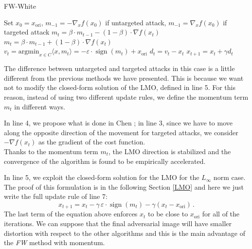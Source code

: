 \documentclass[10pt,twocolumn,letterpaper, english]{article}
\newcommand{\sign}{\mathop{\mathrm{sign}}}
\theoremstyle{definition}
\theoremstyle{plain}
\theoremstyle{plain}
\theoremstyle{plain}
\theoremstyle{plain}
\theoremstyle{remark}
\theoremstyle{remark}
\theoremstyle{definition}
\theoremstyle{definition}
\theoremstyle{definition}
\theoremstyle{definition}
\renewcommand{\epsilon}{\varepsilon}
\begin{document}
\begin{algorithm}
\caption{FW-White}\label{FW}
\begin{algorithmic}[1]

\State Set $x_0 = x_{\text{ori}}$, $m_{-1} = - \nabla_x f(x_0)$ if untargeted attack, $m_{-1} = \nabla_x f(x_0)$ if targeted attack
    \State $m_t = \beta \cdot m_{t-1} - (1-\beta) \cdot \nabla f(x_t) $ 
    \State $m_t = \beta \cdot m_{t-1} + (1-\beta) \cdot \nabla f(x_t) $ 
    \State $v_t = \text{argmin}_{x \in C} \langle x, m_t \rangle = - \epsilon \cdot \sign (m_t) + x_{\text{ori}} $
    \State $d_t = v_t - x_t $
    \State $x_{t+1} = x_t + \gamma d_t $
    
\EndFor
\end{algorithmic}
\end{algorithm}

The difference between untargeted and targeted attacks in this case is a little different from the previous methods we have presented. 
This is because we want not to modify the closed-form solution of the LMO, defined in line 5. 
For this reason, instead of using two different update rules, we define the momentum term $m_t$ in different ways. 

In line 4, we propose what is done in Chen \cite{frank}; in line 3, since we have to move along the opposite direction of the movement for targeted attacks, we consider $- \nabla f(x_t)$ as the gradient of the cost function. \\

Thanks to the momentum term $m_t$, the LMO direction is stabilized and the convergence of the algorithm is found to be empirically accelerated. 

In line 5, we exploit the closed-form solution for the LMO for the $L_\infty$ norm case. 
The proof of this formulation is in the following Section \ref{LMO} and here we just write the full update rule of line 7:
\begin{equation}
    x_{t+1} = x_t - \gamma \, \epsilon \cdot \sign(m_t) - \gamma (x_t - x_{\text{ori}}) \,. \label{update-}
\end{equation}
The last term of the equation above enforces $x_t$ to be close to $x_{\text{ori}}$ for all of the iterations. 
We can suppose that the final adversarial image will have smaller distortion with respect to the other algorithms and this is the main advantage of the \textit{FW} method with momentum. 
\end{document}
